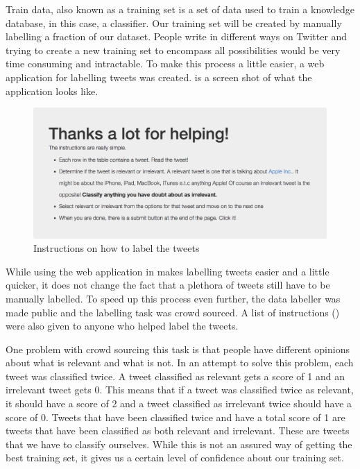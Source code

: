 Train data, also known as a training set is a set of data used to train a knowledge database, in
this case, a classifier. Our training set will be created by manually labelling a fraction of our
dataset. People write in different ways on Twitter and trying to create a new training set to
encompass all possibilities would be very time consuming and intractable. To make this process a
little easier, a web application for labelling tweets was created.  is a
screen shot of what the application looks like.

\begin{figure}
  \begin{center}
    \includegraphics[scale=0.4]{Figures/labeller_instructions}
  \end{center}
  \caption{Instructions on how to label the tweets}
\label{fig:labeller-instructions}
\end{figure}

While using the web application in  makes labelling tweets easier and a
little quicker, it does not change the fact that a plethora of tweets still have to be manually
labelled. To speed up this process even further, the data labeller was made public and the labelling
task was crowd sourced. A list of instructions () were also given
to anyone who helped label the tweets.

One problem with crowd sourcing this task is that people have different opinions about what is
relevant and what is not. In an attempt to solve this problem, each tweet was classified twice. A
tweet classified as relevant gets a score of 1 and an irrelevant tweet gets 0. This means that if a
tweet was classified twice as relevant, it should have a score of 2 and a tweet classified as
irrelevant twice should have a score of 0. Tweets that have been classified twice and have a total
score of 1 are tweets that have been classified as both relevant and irrelevant. These are tweets
that we have to classify ourselves. While this is not an assured way of getting the best training
set, it gives us a certain level of confidence about our training set.

